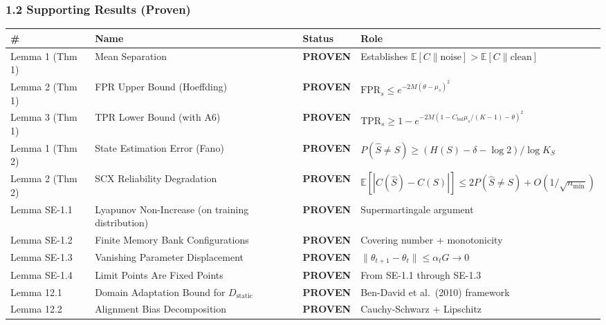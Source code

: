 \documentclass[
  12pt,
]{ctexart}
\begin{document}
\subsubsection{1.2 Supporting Results
(Proven)}\label{supporting-results-proven}

\begin{longtable}[]{@{}
  >{\raggedright\arraybackslash}p{}
  >{\raggedright\arraybackslash}p{}
  >{\raggedright\arraybackslash}p{}
  >{\raggedright\arraybackslash}p{}@{}}
\toprule\noalign{}
\begin{minipage}[b]{\linewidth}\raggedright
\#
\end{minipage} & \begin{minipage}[b]{\linewidth}\raggedright
Name
\end{minipage} & \begin{minipage}[b]{\linewidth}\raggedright
Status
\end{minipage} & \begin{minipage}[b]{\linewidth}\raggedright
Role
\end{minipage} \\
\midrule\noalign{}
\endhead
\bottomrule\noalign{}
\endlastfoot
Lemma 1 (Thm 1) & Mean Separation & \textbf{PROVEN} & Establishes
\(\mathbb{E}[C\|\text{noise}] > \mathbb{E}[C\|\text{clean}]\) \\
Lemma 2 (Thm 1) & FPR Upper Bound (Hoeffding) & \textbf{PROVEN} &
\(\text{FPR}_s \leq e^{-2M(\theta-\mu_s)^2}\) \\
Lemma 3 (Thm 1) & TPR Lower Bound (with A6) & \textbf{PROVEN} &
\(\text{TPR}_s \geq 1 - e^{-2M(1-C_{\text{bal}}\mu_s/(K-1)-\theta)^2}\) \\
Lemma 1 (Thm 2) & State Estimation Error (Fano) & \textbf{PROVEN} &
\(P(\hat{S} \neq S) \geq (H(S)-\delta-\log 2)/\log K_S\) \\
Lemma 2 (Thm 2) & SCX Reliability Degradation & \textbf{PROVEN} &
\(\mathbb{E}[|C(\hat{S})-C(S)|] \leq 2P(\hat{S}\neq S) + O(1/\sqrt{n_{\min}})\) \\
Lemma SE-1.1 & Lyapunov Non-Increase (on training distribution) &
\textbf{PROVEN} & Supermartingale argument \\
Lemma SE-1.2 & Finite Memory Bank Configurations & \textbf{PROVEN} &
Covering number + monotonicity \\
Lemma SE-1.3 & Vanishing Parameter Displacement & \textbf{PROVEN} &
\(\|\theta_{t+1}-\theta_t\| \leq \alpha_t G \to 0\) \\
Lemma SE-1.4 & Limit Points Are Fixed Points & \textbf{PROVEN} & From
SE-1.1 through SE-1.3 \\
Lemma 12.1 & Domain Adaptation Bound for \(D_{\text{static}}\) &
\textbf{PROVEN} & Ben-David et al.~(2010) framework \\
Lemma 12.2 & Alignment Bias Decomposition & \textbf{PROVEN} &
Cauchy-Schwarz + Lipschitz \\
\end{longtable}
\end{document}
